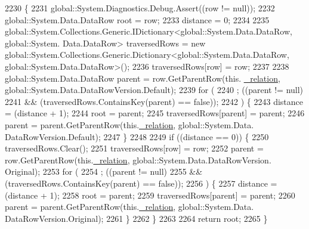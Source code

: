 \begin{DoxyCode}
2230                                                                                                        \{
2231                 global::System.Diagnostics.Debug.Assert((row != null));
2232                 global::System.Data.DataRow root = row;
2233                 distance = 0;
2234 
2235                 global::System.Collections.Generic.IDictionary<global::System.Data.DataRow, global::System.
      Data.DataRow> traversedRows = \textcolor{keyword}{new} global::System.Collections.Generic.Dictionary<global::System.Data.DataRow,
       global::System.Data.DataRow>();
2236                 traversedRows[row] = row;
2237 
2238                 global::System.Data.DataRow parent = row.GetParentRow(this.
      \hyperlink{class_proyecto___integrador__3_1_1ds_usuarios_table_adapters_1_1_table_adapter_manager_1_1_self_reference_comparer_aa94b2ca3f3ea52c71719c2b968ae574a}{\_relation}, global::System.Data.DataRowVersion.Default);
2239                 \textcolor{keywordflow}{for} (
2240                 ; ((parent != null) 
2241                             && (traversedRows.ContainsKey(parent) == \textcolor{keyword}{false})); 
2242                 ) \{
2243                     distance = (distance + 1);
2244                     root = parent;
2245                     traversedRows[parent] = parent;
2246                     parent = parent.GetParentRow(this.\hyperlink{class_proyecto___integrador__3_1_1ds_usuarios_table_adapters_1_1_table_adapter_manager_1_1_self_reference_comparer_aa94b2ca3f3ea52c71719c2b968ae574a}{\_relation}, global::System.Data.
      DataRowVersion.Default);
2247                 \}
2248 
2249                 \textcolor{keywordflow}{if} ((distance == 0)) \{
2250                     traversedRows.Clear();
2251                     traversedRows[row] = row;
2252                     parent = row.GetParentRow(this.\hyperlink{class_proyecto___integrador__3_1_1ds_usuarios_table_adapters_1_1_table_adapter_manager_1_1_self_reference_comparer_aa94b2ca3f3ea52c71719c2b968ae574a}{\_relation}, global::System.Data.DataRowVersion.
      Original);
2253                     \textcolor{keywordflow}{for} (
2254                     ; ((parent != null) 
2255                                 && (traversedRows.ContainsKey(parent) == \textcolor{keyword}{false})); 
2256                     ) \{
2257                         distance = (distance + 1);
2258                         root = parent;
2259                         traversedRows[parent] = parent;
2260                         parent = parent.GetParentRow(this.\hyperlink{class_proyecto___integrador__3_1_1ds_usuarios_table_adapters_1_1_table_adapter_manager_1_1_self_reference_comparer_aa94b2ca3f3ea52c71719c2b968ae574a}{\_relation}, global::System.Data.
      DataRowVersion.Original);
2261                     \}
2262                 \}
2263 
2264                 \textcolor{keywordflow}{return} root;
2265             \}
\end{DoxyCode}


